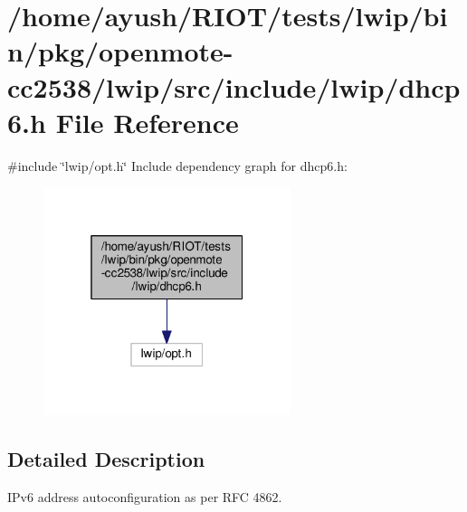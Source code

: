 \hypertarget{openmote-cc2538_2lwip_2src_2include_2lwip_2dhcp6_8h}{}\section{/home/ayush/\+R\+I\+O\+T/tests/lwip/bin/pkg/openmote-\/cc2538/lwip/src/include/lwip/dhcp6.h File Reference}
\label{openmote-cc2538_2lwip_2src_2include_2lwip_2dhcp6_8h}
{\ttfamily \#include \char`\"{}lwip/opt.\+h\char`\"{}}\newline
Include dependency graph for dhcp6.\+h\+:
\nopagebreak
\begin{figure}[H]
\begin{center}
\leavevmode
\includegraphics[width=205pt]{openmote-cc2538_2lwip_2src_2include_2lwip_2dhcp6_8h__incl}
\end{center}
\end{figure}


\subsection{Detailed Description}
I\+Pv6 address autoconfiguration as per R\+FC 4862. 